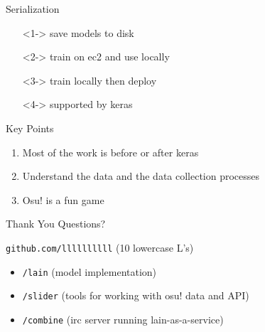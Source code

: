 \documentclass[table]{beamer}
\begin{document}
\begin{frame}{Serialization}
  \begin{itemize}
  \item[]<1-> save models to disk
  \item[]<2-> train on ec2 and use locally
  \item[]<3-> train locally then deploy
  \item[]<4-> supported by keras
  \end{itemize}
\end{frame}

\begin{frame}{Key Points}
  \begin{enumerate}
  \item<1-> Most of the work is before or after keras
  \item<2-> Understand the data and the data collection processes
  \item<3-> Osu! is a fun game
  \end{enumerate}
\end{frame}

\begin{frame}{Thank You}
  Questions?

  \begin{block}{\texttt{github.com/llllllllll} (10 lowercase L's)}
    \begin{itemize}
    \item \texttt{/lain} (model implementation)
    \item \texttt{/slider} (tools for working with osu! data and API)
    \item \texttt{/combine} (irc server running lain-as-a-service)
    \end{itemize}
  \end{block}
\end{frame}
\end{document}
